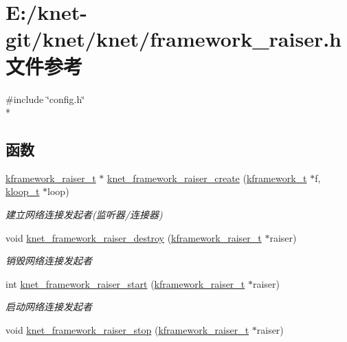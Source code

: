 \hypertarget{a00074}{}\section{E\+:/knet-\/git/knet/knet/framework\+\_\+raiser.h 文件参考}
\label{a00074}
{\ttfamily \#include \char`\"{}config.\+h\char`\"{}}\\*
\subsection*{函数}
\begin{DoxyCompactItemize}
\item 
\hyperlink{a00066_af10637001508cbbf3a84f95c71318532_af10637001508cbbf3a84f95c71318532}{kframework\+\_\+raiser\+\_\+t} $\ast$ \hyperlink{a00074_a2b6bd6bd9b9c60ab24eab0c0700bc855_a2b6bd6bd9b9c60ab24eab0c0700bc855}{knet\+\_\+framework\+\_\+raiser\+\_\+create} (\hyperlink{a00066_a3195a3be35782fc1efb920c811be111d_a3195a3be35782fc1efb920c811be111d}{kframework\+\_\+t} $\ast$f, \hyperlink{a00066_a97fc76209a58362019f1ded9169e397f_a97fc76209a58362019f1ded9169e397f}{kloop\+\_\+t} $\ast$loop)
\begin{DoxyCompactList}\small\item\em 建立网络连接发起者(监听器/连接器) \end{DoxyCompactList}\item 
void \hyperlink{a00074_abafbab78ce889f71a99d7200977507a2_abafbab78ce889f71a99d7200977507a2}{knet\+\_\+framework\+\_\+raiser\+\_\+destroy} (\hyperlink{a00066_af10637001508cbbf3a84f95c71318532_af10637001508cbbf3a84f95c71318532}{kframework\+\_\+raiser\+\_\+t} $\ast$raiser)
\begin{DoxyCompactList}\small\item\em 销毁网络连接发起者 \end{DoxyCompactList}\item 
int \hyperlink{a00074_ad6b3a3a742cf17b521c85962b693efc5_ad6b3a3a742cf17b521c85962b693efc5}{knet\+\_\+framework\+\_\+raiser\+\_\+start} (\hyperlink{a00066_af10637001508cbbf3a84f95c71318532_af10637001508cbbf3a84f95c71318532}{kframework\+\_\+raiser\+\_\+t} $\ast$raiser)
\begin{DoxyCompactList}\small\item\em 启动网络连接发起者 \end{DoxyCompactList}\item 
void \hyperlink{a00074_a6e9cfd9d165129b0099e929885aa78e5_a6e9cfd9d165129b0099e929885aa78e5}{knet\+\_\+framework\+\_\+raiser\+\_\+stop} (\hyperlink{a00066_af10637001508cbbf3a84f95c71318532_af10637001508cbbf3a84f95c71318532}{kframework\+\_\+raiser\+\_\+t} $\ast$raiser)

\end{DoxyCompactItemize}
